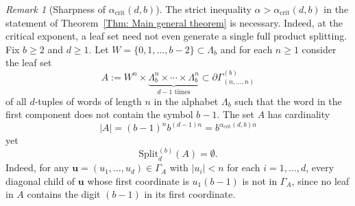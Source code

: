 \documentclass[11pt]{amsart}
\newcommand\labs[1]{\left\lvert#1\right\rvert}
\newcommand{\Split}{\mathrm{Split}}
\renewcommand{\geq}{\geqslant}
\theoremstyle{plain}
\theoremstyle{definition}
\theoremstyle{remark}
\newtheorem{rema}[thm]{Remark}
\begin{document}
\begin{rema}[Sharpness of $\alpha_{\text{crit}}(d,b)$]
The strict inequality $\alpha > \alpha_{\text{crit}}(d,b)$ in the statement of Theorem~\ref{Thm: Main general theorem} is necessary. Indeed, at the critical exponent, a leaf set need not even generate a single full product splitting. Fix $b\geq 2$ and $d\geq 1$. Let $W = \{0,1,\ldots,b-2\} \subset \Lambda_b$ and for each $n\geq 1$ consider the leaf set
\[ A:= W^n \times \underbrace{\Lambda_b^{n} \times \cdots \times \Lambda_b^{n}}_{d-1 \text{ times}} \subset \partial \Gamma_{(n,\ldots,n)}^{(b)}\]
of all $d$-tuples of words of length $n$ in the alphabet $\Lambda_b$ such that the word in the first component does not contain the symbol $b-1$. The set $A$ has cardinality
\[\labs{A} = (b-1)^{n} b^{(d-1)n} = b^{\alpha_{\text{crit}}(d,b)n}\]
yet
\[ \Split_d^{(b)}(A) = \emptyset.\]
Indeed, for any $\mathbf{u}=(u_1,\ldots,u_d) \in \Gamma_{A}$ with $\labs{u_i}< n$ for each $i=1,\ldots,d$, every diagonal child of $\mathbf{u}$ whose first coordinate is $u_1 (b-1)$ is not in $\Gamma_A$, since no leaf in $A$ contains the digit $(b-1)$ in its first coordinate.
\end{rema}
\end{document}
